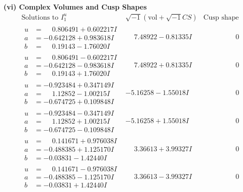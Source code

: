 \documentclass[1p]{elsarticle_modified}
\theoremstyle{definition}
\newcommand{\I}{\sqrt{-1}}
\begin{document}
\newpage\flushleft \textbf{(vi) Complex Volumes and Cusp Shapes}
$$\begin{array}{c|c|c}  
\text{Solutions to }I^u_{1}& \I (\text{vol} + \sqrt{-1}CS) & \text{Cusp shape}\\
 \hline 
\begin{aligned}
u &= \phantom{-}0.806491 + 0.602217 I \\
a &= -0.642128 + 0.983618 I \\
b &= \phantom{-}0.19143 - 1.76020 I\end{aligned}
 & \phantom{-}7.48922 - 0.81335 I & \phantom{-0.000000 } 0 \\ \hline\begin{aligned}
u &= \phantom{-}0.806491 - 0.602217 I \\
a &= -0.642128 - 0.983618 I \\
b &= \phantom{-}0.19143 + 1.76020 I\end{aligned}
 & \phantom{-}7.48922 + 0.81335 I & \phantom{-0.000000 } 0 \\ \hline\begin{aligned}
u &= -0.923484 + 0.347149 I \\
a &= \phantom{-}1.12852 - 1.00215 I \\
b &= -0.674725 + 0.109848 I\end{aligned}
 & -5.16258 - 1.55018 I & \phantom{-0.000000 } 0 \\ \hline\begin{aligned}
u &= -0.923484 - 0.347149 I \\
a &= \phantom{-}1.12852 + 1.00215 I \\
b &= -0.674725 - 0.109848 I\end{aligned}
 & -5.16258 + 1.55018 I & \phantom{-0.000000 } 0 \\ \hline\begin{aligned}
u &= \phantom{-}0.141671 + 0.976038 I \\
a &= -0.488385 + 1.125170 I \\
b &= -0.03831 - 1.42440 I\end{aligned}
 & \phantom{-}3.36613 + 3.99327 I & \phantom{-0.000000 } 0 \\ \hline\begin{aligned}
u &= \phantom{-}0.141671 - 0.976038 I \\
a &= -0.488385 - 1.125170 I \\
b &= -0.03831 + 1.42440 I\end{aligned}
 & \phantom{-}3.36613 - 3.99327 I & \phantom{-0.000000 } 0 \\ \hline\begin{aligned}

\end{aligned}
\end{array}$$
\end{document}
